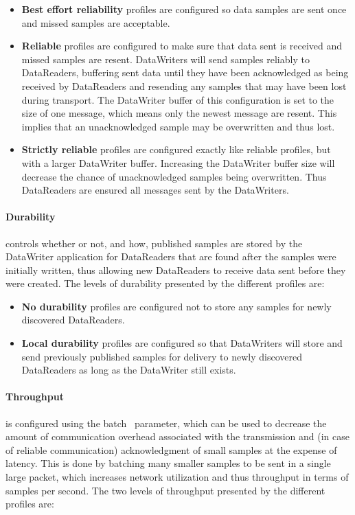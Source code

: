 \begin{itemize}
	\item \textbf{Best effort reliability} profiles are configured so data samples are sent once and missed samples are acceptable.
	\item \textbf{Reliable} profiles are configured to make sure that data sent is received and missed samples are resent. DataWriters will send samples reliably to DataReaders, buffering sent data until they have been acknowledged as being received by DataReaders and resending any samples that may have been lost during transport. The DataWriter buffer of this configuration is set to the size of one message, which means only the newest message are resent. This implies that an unacknowledged sample may be overwritten and thus lost. 
	\item \textbf{Strictly reliable} profiles are configured exactly like reliable profiles, but with a larger DataWriter buffer. Increasing the DataWriter buffer size will decrease the chance of unacknowledged samples being overwritten. Thus DataReaders are ensured all messages sent by the DataWriters.
\end{itemize}

\paragraph{Durability} controls whether or not, and how, published samples are stored by the DataWriter application for DataReaders that are found after the samples were initially written, thus allowing new DataReaders to receive data sent before they were created. The levels of durability presented by the different profiles are:

\begin{itemize}
	\item \textbf{No durability} profiles are configured not to store any samples for newly discovered DataReaders.
	\item \textbf{Local durability} profiles are configured so that DataWriters will store and send previously published samples for delivery to newly discovered DataReaders as long as the DataWriter still exists.
\end{itemize}

\paragraph{Throughput} is configured using the batch~\cite{rtiConnextUsersManual} parameter, which can be used to decrease the amount of communication overhead associated with the transmission and (in case of reliable communication) acknowledgment of small samples at the expense of latency. This is done by batching many smaller samples to be sent in a single large packet, which increases network utilization and thus throughput in terms of samples per second. The two levels of throughput presented by the different profiles are:

